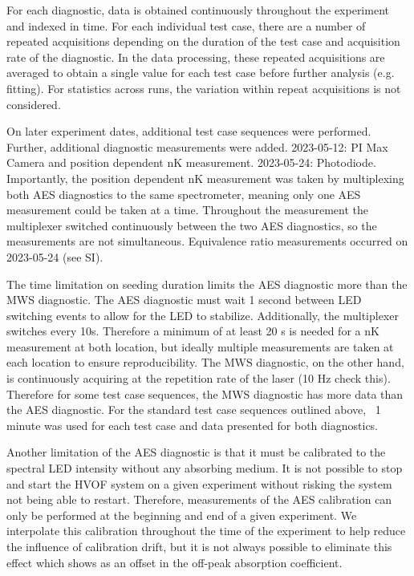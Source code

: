 For each diagnostic, data is obtained continuously throughout the experiment and indexed in time. For each individual test case, there are a number of repeated acquisitions depending on the duration of the test case and acquisition rate of the diagnostic. In the data processing, these repeated acquisitions are averaged to obtain a single value for each test case before further analysis (e.g. fitting). For statistics across runs, the variation within repeat acquisitions is not considered. 

On later experiment dates, additional test case sequences were performed. Further, additional diagnostic measurements were added. 2023-05-12: PI Max Camera and position dependent nK measurement. 2023-05-24: Photodiode. Importantly, the position dependent nK measurement was taken by multiplexing both AES diagnostics to the same spectrometer, meaning only one AES measurement could be taken at a time. Throughout the measurement the multiplexer switched continuously between the two AES diagnostics, so the measurements are not simultaneous. Equivalence ratio measurements occurred on 2023-05-24 (see SI). 

The time limitation on seeding duration limits the AES diagnostic more than the MWS diagnostic. The AES diagnostic must wait 1 second between LED switching events to allow for the LED to stabilize. Additionally, the multiplexer switches every 10s. Therefore a minimum of at least 20 s is needed for a nK measurement at both location, but ideally multiple measurements are taken at each location to ensure reproducibility. The MWS diagnostic, on the other hand, is continuously acquiring at the repetition rate of the laser (10 Hz check this). Therefore for some test case sequences, the MWS diagnostic has more data than the AES diagnostic. For the standard test case sequences outlined above, ~1 minute was used for each test case and data presented for both diagnostics.  

Another limitation of the AES diagnostic is that it must be calibrated to the spectral LED intensity without any absorbing medium. It is not possible to stop and start the HVOF system on a given experiment without risking the system not being able to restart. Therefore, measurements of the AES calibration can only be performed at the beginning and end of a given experiment. We interpolate this calibration throughout the time of the experiment to help reduce the influence of calibration drift, but it is not always possible to eliminate this effect which shows as an offset in the off-peak absorption coefficient.

